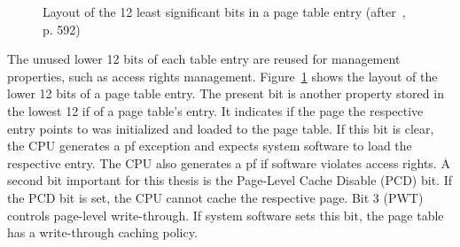 
\begin{figure}
  \begin{center}
    
    \caption{Layout of the 12 least significant bits in a page table entry (after~\cite{amd_manual}, p. 592)}
    \label{fig:state:technical:paging_rights}
  \end{center}
\end{figure}
The unused lower 12 bits of each table entry are reused for management
properties, such as access rights management.
Figure~\ref{fig:state:technical:paging_rights} shows the layout of the lower 12
bits of a page table entry. The present bit is another property stored in the
lowest 12 if of a page table's entry. It indicates if the page the respective
entry points to was initialized and loaded to the page table. If this bit is
clear, the CPU generates a \gls{pf} exception and expects system software to
load the respective entry. The CPU also generates a \gls{pf} if software
violates access rights. A second bit important for this thesis is the Page-Level
Cache Disable (PCD) bit. If the PCD bit is set, the CPU cannot cache the
respective page. Bit 3 (PWT) controls page-level write-through. If system
software sets this bit, the page table has a write-through caching policy.
